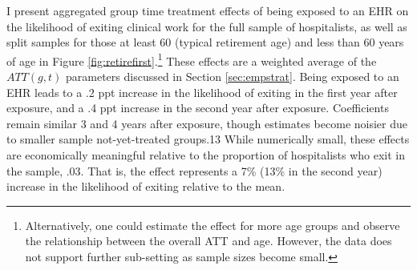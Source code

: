 \documentclass[12pt]{article}
\begin{document}
I present aggregated group time treatment effects of being exposed to an EHR on the likelihood of exiting clinical work for the full sample of hospitalists, as well as split samples for those at least 60 (typical retirement age) and less than 60 years of age in Figure \ref{fig:retirefirst}.\footnote{Alternatively, one could estimate the effect for more age groups and observe the relationship between the overall ATT and age. However, the data does not support further sub-setting as sample sizes become small.} These effects are a weighted average of the $ATT(g,t)$ parameters discussed in Section \ref{sec:empstrat}. Being exposed to an EHR leads to a .2 ppt increase in the likelihood of exiting in the first year after exposure, and a .4 ppt increase in the second year after exposure. Coefficients remain similar 3 and 4 years after exposure, though estimates become noisier due to smaller sample not-yet-treated groups.13 While numerically small, these effects are economically meaningful relative to the proportion of hospitalists who exit in the sample, .03. That is, the effect represents a 7\% (13\% in the second year) increase in the likelihood of exiting relative to the mean.   
\end{document}
